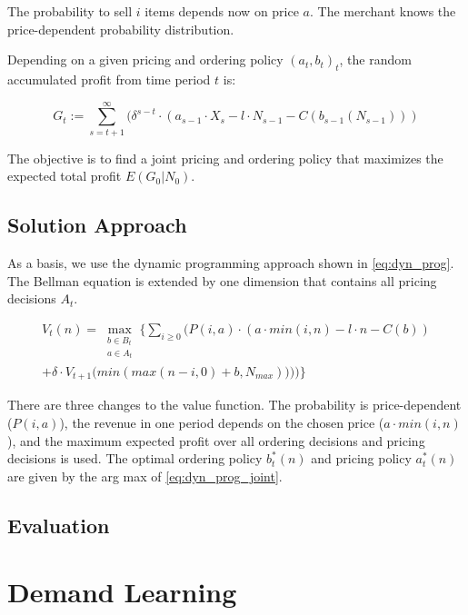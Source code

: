 The probability to sell $i$ items depends now on price $a$.
The merchant knows the price-dependent probability distribution.

Depending on a given pricing and ordering policy $(a_t, b_t)_t$, the random accumulated profit from time period $t$ is:

$$
G_t := \sum_{s=t+1}^{\infty} (\delta^{s-t} \cdot (a_{s-1} \cdot X_s - l \cdot N_{s-1} - C(b_{s-1}(N_{s-1})))
$$

The objective is to find a joint pricing and ordering policy that maximizes the expected total profit $E(G_0 | N_0)$.

\subsection{Solution Approach}
\label{section:joint_solution}
As a basis, we use the dynamic programming approach shown in \cref{eq:dyn_prog}.
The Bellman equation is extended by one dimension that contains all pricing decisions $A_t$.

\begin{equation}
\begin{split}
V_t(n) = \max_{\substack{b \in B_t \\ a \in A_t}} \Bigg\{
\sum_{i \geq 0} \Big(
P(i, a) \cdot (
a \cdot min(i, n) %
- l \cdot n %
- C(b) %
) \\
+ \delta \cdot V_{t+1}\big(min(max(n - i, 0) + b, N_{max}))\big)
\Big)\Bigg\}
\end{split}
\label{eq:dyn_prog_joint}
\end{equation}

There are three changes to the value function.
The probability is price-dependent ($P(i, a)$), the revenue in one period depends on the chosen price ($a \cdot min(i, n)$), and the maximum expected profit over all ordering decisions and pricing decisions is used.
The optimal ordering policy $b^*_t(n)$ and pricing policy $a^*_t(n)$ are given by the arg max of \cref{eq:dyn_prog_joint}.

\subsection{Evaluation}

\section{Demand Learning}
\label{section:demand_learning}

